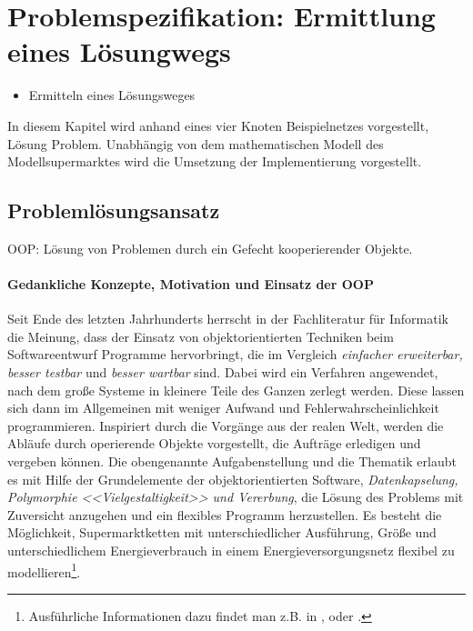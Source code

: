 \chapter{Problemspezifikation: Ermittlung eines Lösungwegs}
\label{chap:problemspezifikation}
\minitoc
\begin{itemize}
\item Ermitteln eines Lösungsweges
\end{itemize}
In diesem Kapitel wird anhand eines vier Knoten Beispielnetzes vorgestellt, Lösung Problem. Unabhängig von dem mathematischen Modell des Modellsupermarktes wird die Umsetzung der Implementierung
vorgestellt.

\section{Problemlösungsansatz}

OOP: Lösung von Problemen durch ein Gefecht kooperierender Objekte.\cite{java}
\subsubsection*{Gedankliche Konzepte, Motivation und Einsatz der OOP}
Seit Ende des letzten Jahrhunderts herrscht in der Fachliteratur für Informatik die Meinung, dass der Einsatz von
objektorientierten Techniken beim Softwareentwurf Programme hervorbringt, die im Vergleich \textit{einfacher erweiterbar,
besser testbar} und \textit{besser wartbar} sind. Dabei wird ein Verfahren angewendet, nach
dem große Systeme in kleinere Teile des Ganzen zerlegt werden. Diese lassen sich dann im Allgemeinen mit weniger Aufwand und
Fehlerwahrscheinlichkeit programmieren. Inspiriert durch die Vorgänge aus der realen Welt, werden die Abläufe durch
operierende Objekte vorgestellt, die Aufträge erledigen und vergeben können.  Die obengenannte Aufgabenstellung und die
Thematik erlaubt es mit Hilfe der Grundelemente der objektorientierten Software,
\textit{Datenkapselung, Polymorphie <<Vielgestaltigkeit>> und Vererbung}, die Lösung des Problems mit Zuversicht anzugehen
und ein flexibles Programm herzustellen. Es besteht die Möglichkeit, Supermarktketten mit unterschiedlicher Ausführung, Größe
und unterschiedlichem Energieverbrauch in einem Energieversorgungsnetz flexibel zu modellieren\footnote{ Ausführliche
Informationen dazu findet man z.B. in \cite{OOP},\cite{java} oder \cite{python}.}.


